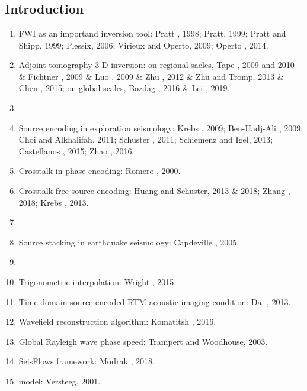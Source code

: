 \renewcommand{\pmk}{Tromp\_2019\_GJI\_Source encoding adjoint}
\renewcommand{\prf}{FWI/\pmk.pdf}
\renewcommand{\pti}{Source encoding for adjoint tomography}
\renewcommand{\pay}{Jeroen Tromp and Etienne Bachmann, 2019}
\renewcommand{\pjo}{Geophys. J. Int.}
\renewcommand{\pda}{2019/8/2 Fri.}

\section{\pinfo}
\subsection{Introduction}
\begin{enumerate}[\hspace{10mm*}]
  \item FWI as an importand inversion tool: Pratt \etal, 1998; Pratt, 1999;
    Pratt and Shipp, 1999; Plessix, 2006; Virieux and Operto, 2009;
    Operto \etal, 2014.
  \item Adjoint tomography 3-D inversion: on regional sacles, Tape \etal, 2009
    and 2010 \& Fichtner \etal, 2009 \& Luo \etal, 2009 \& Zhu \etal, 2012 \&
    Zhu and Tromp, 2013 \& Chen \etal, 2015;
    on global scales, Bozdag \etal, 2016 \& Lei \etal, 2019.
  \item \sline
  \item Source encoding in exploration seismology: Krebs \etal, 2009;
    Ben-Hadj-Ali \etal, 2009; Choi and Alkhalifah, 2011; Schuster \etal, 2011;
    Schiemenz and Igel, 2013; Castellanos \etal, 2015; Zhao \etal, 2016.
  \item Crosstalk in phase encoding: Romero \etal, 2000.
  \item Crosstalk-free source encoding: Huang and Schuster, 2013 \& 2018;
    Zhang \etal, 2018; Krebs \etal, 2013.
  \item \sline
  \item Source stacking in earthquake seismology: Capdeville \etal, 2005.
  \item \sline
  \item Trigonometric interpolation: Wright \etal, 2015.
  \item Time-domain source-encoded RTM acoustic imaging condition:
    Dai \etal, 2013.
  \item Wavefield reconstruction algorithm: Komatitsh \etal, 2016.
  \item Global Rayleigh wave phase speed: Trampert and Woodhouse, 2003.
  \item SeisFlows framework: Modrak \etal, 2018.
  \item {} model: Versteeg, 2001.
\end{enumerate}

